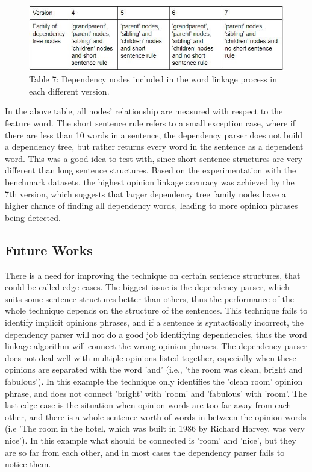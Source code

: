 \documentclass{sig-alternate}
\begin{document}
\begin{figure}
\centering
\includegraphics[scale=0.65]{images/table7.JPG}
Table 7: Dependency nodes included in the word linkage process in each different version.
\end{figure}

In the above table, all nodes' relationship are measured with respect to the feature word. The short sentence rule refers to a small exception case, where if there are less than 10 words in a sentence, the dependency parser does not build a dependency tree, but rather returns every word in the sentence as a dependent word. This was a good idea to test with, since short sentence structures are very different than long sentence structures. Based on the experimentation with the benchmark datasets, the highest opinion linkage accuracy was achieved by the 7th version, which suggests that larger dependency tree family nodes have a higher chance of finding all dependency words, leading to more opinion phrases being detected.

\subsection{Future Works}
There is a need for improving the technique on certain sentence structures, that could be called edge cases. The biggest issue is the dependency parser, which suits some sentence structures better than others, thus the performance of the whole technique depends on the structure of the sentences. This technique fails to identify implicit opinions phrases, and if a sentence is syntactically incorrect, the dependency parser will not do a good job identifying dependencies, thus the word linkage algorithm will connect the wrong opinion phrases. The dependency parser does not deal well with multiple opinions listed together, especially when these opinions are separated with the word 'and' (i.e., 'the room was clean, bright and fabulous'). In this example the technique only identifies the 'clean room' opinion phrase, and does not connect 'bright' with 'room' and 'fabulous' with 'room'. The last edge case is the situation when opinion words are too far away from each other, and there is a whole sentence worth of words in between the opinion words (i.e 'The room in the hotel, which was built in 1986 by Richard Harvey, was very nice'). In this example what should be connected is 'room' and 'nice', but they are so far from each other, and in most cases the dependency parser fails to notice them.
\end{document}
